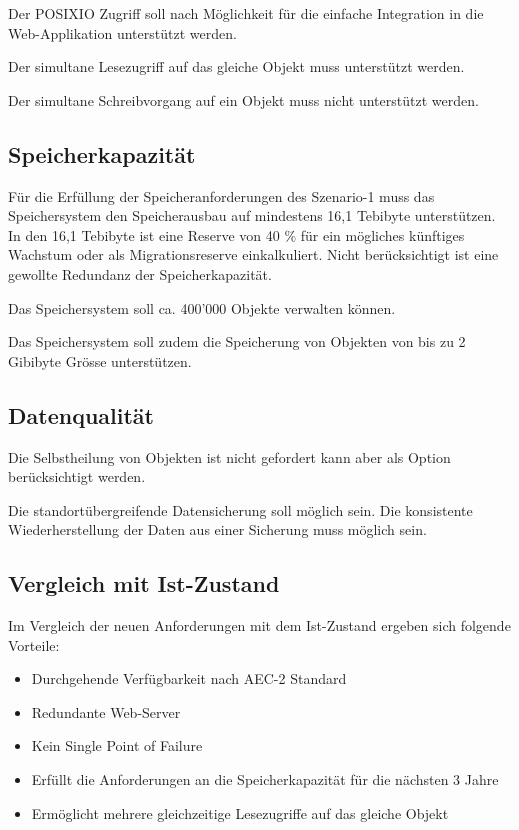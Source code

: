 Der \gls{POSIXIO} Zugriff soll nach Möglichkeit für die einfache Integration in die Web-Applikation unterstützt werden.

Der simultane Lesezugriff auf das gleiche Objekt muss unterstützt werden.

Der simultane Schreibvorgang auf ein Objekt muss nicht unterstützt werden.

\subsection{Speicherkapazität}
Für die Erfüllung der Speicheranforderungen des Szenario-1 muss das Speichersystem den Speicherausbau auf mindestens 16,1 Tebibyte unterstützen. In den 16,1 Tebibyte ist eine Reserve von 40 \% für ein mögliches künftiges Wachstum oder als Migrationsreserve einkalkuliert. Nicht berücksichtigt ist eine gewollte Redundanz der Speicherkapazität.

Das Speichersystem soll ca. 400'000 Objekte verwalten können.

Das Speichersystem soll zudem die Speicherung von Objekten von bis zu 2 Gibibyte Grösse unterstützen.

\subsection{Datenqualität}

Die Selbstheilung von Objekten ist nicht gefordert kann aber als Option berücksichtigt werden.

Die standortübergreifende Datensicherung soll möglich sein.
Die konsistente Wiederherstellung der Daten aus einer Sicherung muss möglich sein. 

\subsection{Vergleich mit Ist-Zustand}
Im Vergleich der neuen Anforderungen mit dem Ist-Zustand ergeben sich folgende Vorteile:

\begin{itemize}
\item Durchgehende Verfügbarkeit nach AEC-2 Standard
\item Redundante Web-Server
\item Kein Single Point of Failure
\item Erfüllt die Anforderungen an die Speicherkapazität für die nächsten 3 Jahre
\item Ermöglicht mehrere gleichzeitige Lesezugriffe auf das gleiche Objekt
\end{itemize}

